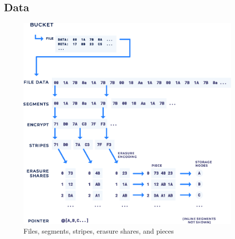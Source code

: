 \documentclass[8pt,fleqn,openany]{book}
\begin{document}
\subsection{Data}

\begin{figure}[!htbp]
\centering
\includegraphics[width=\textwidth]{images/structure.eps}
\caption{Files, segments, stripes, erasure shares, and pieces}
\end{figure}
\end{document}
